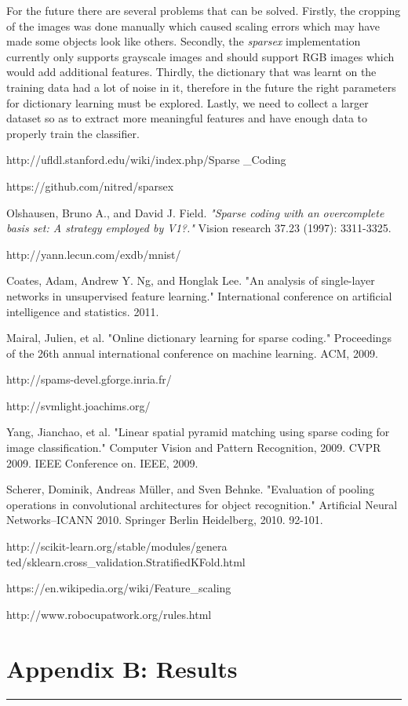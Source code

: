 \documentclass[	DIV=calc,%
				paper=a4,%
				fontsize=11pt,%
				twocolumn]{scrartcl}	 %
\newcommand{\HorRule}{\color{brsublue}%
					 \rule{\linewidth}{1pt}%
					 \color{black}
					 }
\begin{document}
For the future there are several problems that can be solved. Firstly, the cropping of the images was done manually which caused scaling errors which may have made some objects look like others. Secondly, the \textit{sparsex} implementation currently only supports grayscale images and should support RGB images which would add additional features. Thirdly, the dictionary that was learnt on the training data had a lot of noise in it, therefore in the future the right parameters for dictionary learning must be explored. Lastly, we need to collect a larger dataset so as to extract more meaningful features and have enough data to properly train the classifier.

 


\newpage



\begin{thebibliography}{9}

http://ufldl.stanford.edu/wiki/index.php/Sparse
\_Coding

https://github.com/nitred/sparsex

Olshausen, Bruno A., and David J. Field. \textit{"Sparse coding with an overcomplete basis set: A strategy employed by V1?."} Vision research 37.23 (1997): 3311-3325.

http://yann.lecun.com/exdb/mnist/

Coates, Adam, Andrew Y. Ng, and Honglak Lee. "An analysis of single-layer networks in unsupervised feature learning." International conference on artificial intelligence and statistics. 2011.

Mairal, Julien, et al. "Online dictionary learning for sparse coding." Proceedings of the 26th annual international conference on machine learning. ACM, 2009.

http://spams-devel.gforge.inria.fr/

http://svmlight.joachims.org/

Yang, Jianchao, et al. "Linear spatial pyramid matching using sparse coding for image classification." Computer Vision and Pattern Recognition, 2009. CVPR 2009. IEEE Conference on. IEEE, 2009.

Scherer, Dominik, Andreas Müller, and Sven Behnke. "Evaluation of pooling operations in convolutional architectures for object recognition." Artificial Neural Networks–ICANN 2010. Springer Berlin Heidelberg, 2010. 92-101.

http://scikit-learn.org/stable/modules/genera
ted/sklearn.cross\_validation.StratifiedKFold.html

https://en.wikipedia.org/wiki/Feature\_scaling

http://www.robocupatwork.org/rules.html

\end{thebibliography}


\newpage

\onecolumn

\section*{Appendix B: Results}

\HorRule
\end{document}

